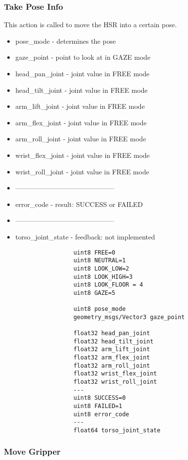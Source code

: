 \documentclass[main.tex]{subfiles}
\begin{document}
					\subsubsection{Take Pose Info}
						This action is called to move the HSR into a certain pose.
						\begin{itemize}
							\item pose\_mode - determines the pose
							\item gaze\_point - point to look at in GAZE mode
							\item head\_pan\_joint - joint value in FREE mode
							\item head\_tilt\_joint - joint value in FREE mode
							\item arm\_lift\_joint - joint value in FREE mode
							\item arm\_flex\_joint - joint value in FREE mode
							\item arm\_roll\_joint - joint value in FREE mode
							\item wrist\_flex\_joint - joint value in FREE mode
							\item wrist\_roll\_joint - joint value in FREE mode
							\item --------------------------------------------
							\item error\_code - result: SUCCESS or FAILED
							\item --------------------------------------------
							\item torso\_joint\_state - feedback: not implemented
						\end{itemize}
					\begin{lstlisting}
					uint8 FREE=0
					uint8 NEUTRAL=1
					uint8 LOOK_LOW=2
					uint8 LOOK_HIGH=3
					uint8 LOOK_FLOOR = 4
					uint8 GAZE=5
		
					uint8 pose_mode
					geometry_msgs/Vector3 gaze_point
		
					float32 head_pan_joint
					float32 head_tilt_joint
					float32 arm_lift_joint
					float32 arm_flex_joint
					float32 arm_roll_joint
					float32 wrist_flex_joint
					float32 wrist_roll_joint
					---
					uint8 SUCCESS=0
					uint8 FAILED=1
					uint8 error_code
					---
					float64 torso_joint_state
					\end{lstlisting}
				\subsubsection{Move Gripper}
\end{document}

